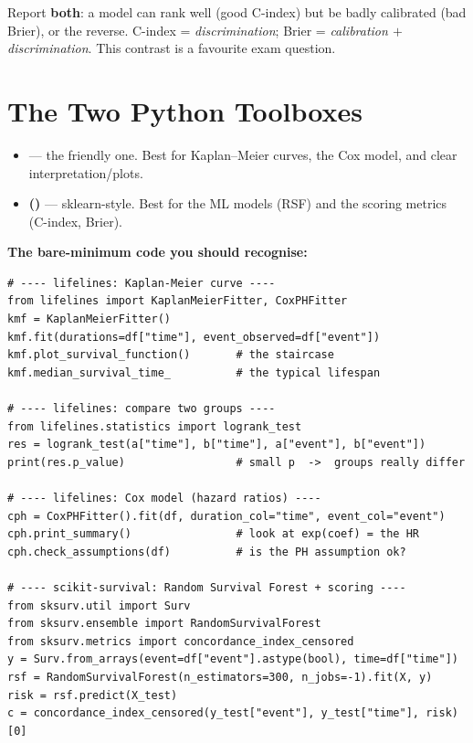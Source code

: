 \documentclass[11pt]{article}
\newcommand{\code}[1]{\texttt{\detokenize{#1}}}
\begin{document}
\begin{tipbox}
Report \textbf{both}: a model can rank well (good C-index) but be badly calibrated (bad Brier), or
the reverse. C-index = \emph{discrimination}; Brier = \emph{calibration $+$ discrimination}.
This contrast is a favourite exam question.
\end{tipbox}

\section{The Two Python Toolboxes}

\begin{itemize}[leftmargin=1.4em]
  \item \textbf{\code{lifelines}} --- the friendly one. Best for Kaplan--Meier curves, the Cox model,
  and clear interpretation/plots.
  \item \textbf{\code{scikit-survival} (\code{sksurv})} --- sklearn-style. Best for the ML models
  (RSF) and the scoring metrics (C-index, Brier).
\end{itemize}

\textbf{The bare-minimum code you should recognise:}
\begin{lstlisting}[style=py]
# ---- lifelines: Kaplan-Meier curve ----
from lifelines import KaplanMeierFitter, CoxPHFitter
kmf = KaplanMeierFitter()
kmf.fit(durations=df["time"], event_observed=df["event"])
kmf.plot_survival_function()       # the staircase
kmf.median_survival_time_          # the typical lifespan

# ---- lifelines: compare two groups ----
from lifelines.statistics import logrank_test
res = logrank_test(a["time"], b["time"], a["event"], b["event"])
print(res.p_value)                 # small p  ->  groups really differ

# ---- lifelines: Cox model (hazard ratios) ----
cph = CoxPHFitter().fit(df, duration_col="time", event_col="event")
cph.print_summary()                # look at exp(coef) = the HR
cph.check_assumptions(df)          # is the PH assumption ok?

# ---- scikit-survival: Random Survival Forest + scoring ----
from sksurv.util import Surv
from sksurv.ensemble import RandomSurvivalForest
from sksurv.metrics import concordance_index_censored
y = Surv.from_arrays(event=df["event"].astype(bool), time=df["time"])
rsf = RandomSurvivalForest(n_estimators=300, n_jobs=-1).fit(X, y)
risk = rsf.predict(X_test)
c = concordance_index_censored(y_test["event"], y_test["time"], risk)[0]
\end{lstlisting}
\end{document}
